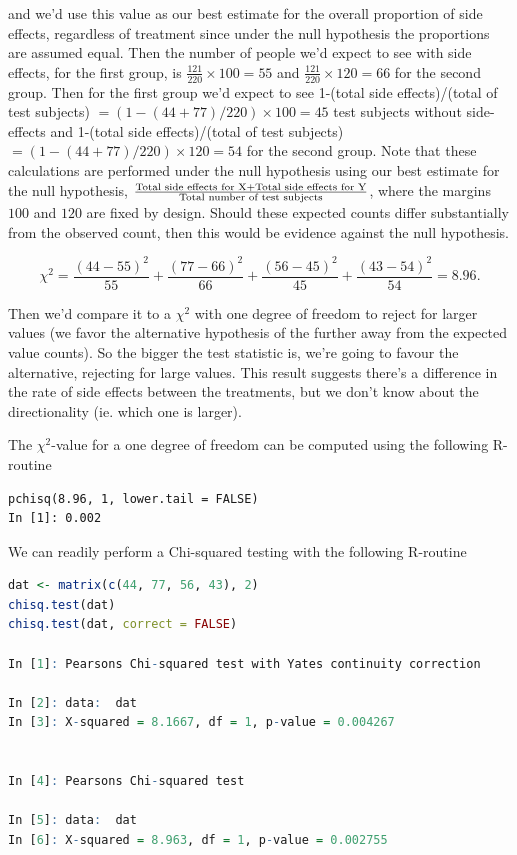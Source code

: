 \documentclass{homework}
\begin{document}
\begin{tcolorbox}[title=Example Chi-squared testing]
and we'd use this value as our best estimate for the overall proportion of side effects, regardless of treatment since under the null hypothesis the proportions are assumed equal. Then the number of people we'd expect to see with side effects, for the first group, is $\frac{121}{220}\times 100 = 55$ and $\frac{121}{220}\times 120 = 66$ for the second group. Then for the first group we'd expect to see 1-(total side effects)/(total of test subjects) $= (1-(44+77)/220) \times 100 = 45$ test subjects without side-effects and 1-(total side effects)/(total of test subjects) $= (1-(44+77)/220) \times 120 = 54$ for the second group. Note that these calculations are performed under the null hypothesis using our best estimate for the null hypothesis, $\frac{\textnormal{Total side effects for X}+\textnormal{Total side effects for Y}}{\textnormal{Total number of test subjects}}$, where the margins $100$ and $120$ are fixed by design. Should these expected counts differ substantially from the observed count, then this would be evidence against the null hypothesis. 

$$
\chi^2 = \frac{(44-55)^2}{55} + \frac{(77-66)^2}{66} + \frac{(56-45)^2}{45} + \frac{(43-54)^2}{54} = 8.96.
$$

Then we'd compare it to a $\chi^2$ with one degree of freedom to reject for larger values (we favor the alternative hypothesis of the further away from the expected value counts). So the bigger the test statistic is, we're going to favour the alternative, rejecting for large values. This result suggests there's a difference in the rate of side effects between the treatments, but we don't know about the directionality (ie. which one is larger).
\end{tcolorbox}

The $\chi^2$-value for a one degree of freedom can be computed using the following R-routine

\begin{lstlisting}
pchisq(8.96, 1, lower.tail = FALSE) 
In [1]: 0.002
\end{lstlisting}

\clearpage

We can readily perform a Chi-squared testing with the following R-routine

\begin{lstlisting}[language=R]
dat <- matrix(c(44, 77, 56, 43), 2)
chisq.test(dat)
chisq.test(dat, correct = FALSE)

In [1]: Pearsons Chi-squared test with Yates continuity correction

In [2]: data:  dat
In [3]: X-squared = 8.1667, df = 1, p-value = 0.004267


In [4]:	Pearsons Chi-squared test

In [5]: data:  dat
In [6]: X-squared = 8.963, df = 1, p-value = 0.002755
\end{lstlisting}
\end{document}
